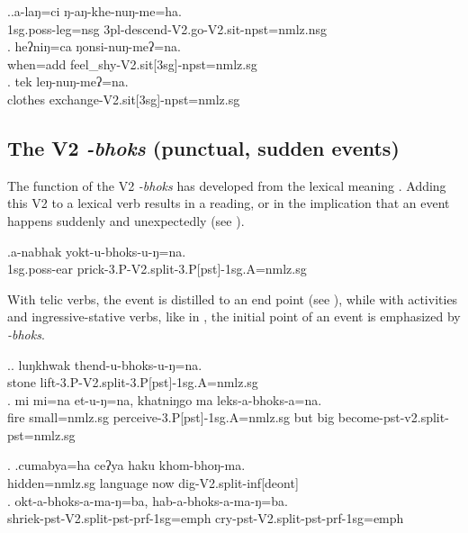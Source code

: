 \ex.\ag.a-laŋ=ci ŋ-aŋ-khe-nuŋ-me=ha.\\
{\sc 1sg.poss-}leg{\sc =nsg} {\sc 3pl-}descend{\sc -V2.go-V2.sit-npst=nmlz.nsg}\\
\bg. heʔniŋ=ca ŋonsi-nuŋ-meʔ=na.\\
when{\sc =add} feel\_shy{\sc -V2.sit[3sg]-npst=nmlz.sg}\\
\bg. tek leŋ-nuŋ-meʔ=na.\\
clothes exchange{\sc -V2.sit[3sg]-npst=nmlz.sg}\\



\subsection{The V2 \emph{-bhoks}  (punctual, sudden events)}\label{V2-split}%

The function of the V2  \emph{-bhoks}  has developed from the lexical meaning . Adding this V2 to a lexical verb results in a  reading, or in the implication that an event happens suddenly and unexpectedly (see \Next). 

\exg.a-nabhak yokt-u-bhoks-u-ŋ=na.\\
{\sc 1sg.poss-}ear prick{\sc -3.P-V2.split-3.P[pst]-1sg.A=nmlz.sg}\\


With telic verbs, the event is distilled to an end point (see \Next), while with activities and ingressive-stative verbs, like in \NNext, the initial point of an event is emphasized by \emph{-bhoks}.

	\ex.\ag. luŋkhwak thend-u-bhoks-u-ŋ=na.\\
		stone lift{\sc -3.P-V2.split-3.P[pst]-1sg.A=nmlz.sg}\\
	\bg. mi mi=na et-u-ŋ=na, khatniŋgo ma leks-a-bhoks-a=na.\\
	fire small{\sc =nmlz.sg} perceive{\sc -3.P[pst]-1sg.A=nmlz.sg} but big become{\sc [3sg]-pst-v2.split-pst=nmlz.sg}\\
	
	
\ex. \ag.cumabya=ha ceʔya haku khom-bhoŋ-ma.\\
hidden{\sc =nmlz.sg} language now dig{\sc -V2.split-inf[deont]}\\
\bg. okt-a-bhoks-a-ma-ŋ=ba, hab-a-bhoks-a-ma-ŋ=ba.\\
	shriek{\sc -pst-V2.split-pst-prf-1sg=emph} cry{\sc -pst-V2.split-pst-prf-1sg=emph}\\
	 
	 
